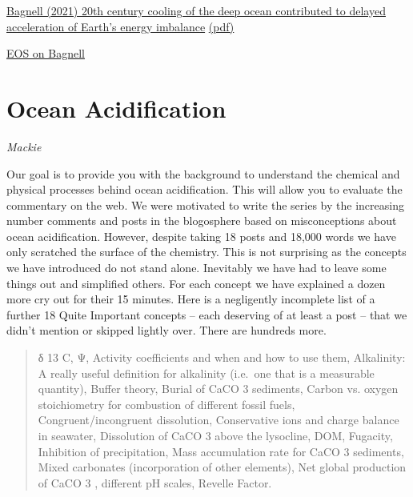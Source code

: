 \documentclass[
]{book}
\begin{document}
\href{https://www.nature.com/articles/s41467-021-24472-3}{Bagnell (2021) 20th century cooling of the deep ocean contributed to delayed acceleration of Earth's energy imbalance}
\href{pdf/Bagnell_2021_Deep_Ocean_Cooling.pdf}{(pdf)}

\href{https://eos.org/articles/deep-ocean-cooling-may-have-offset-global-warming-until-1990}{EOS on Bagnell}

\hypertarget{ocean-acidification}{%
\section{Ocean Acidification}\label{ocean-acidification}}

\emph{Mackie}

Our goal is to provide you with the background to understand the chemical and physical
processes behind ocean acidification. This will allow you to evaluate the commentary on the
web. We were motivated to write the series by the increasing number comments and posts
in the blogosphere based on misconceptions about ocean acidification.
However, despite taking 18 posts and 18,000 words we have only scratched the surface of
the chemistry. This is not surprising as the concepts we have introduced do not stand alone.
Inevitably we have had to leave some things out and simplified others. For each concept we
have explained a dozen more cry out for their 15 minutes. Here is a negligently incomplete
list of a further 18 Quite Important concepts -- each deserving of at least a post -- that we
didn't mention or skipped lightly over. There are hundreds more.

\begin{quote}
δ 13 C, Ψ, Activity coefficients and when and how to use them, Alkalinity: A really useful definition for
alkalinity (i.e.~one that is a measurable quantity), Buffer theory, Burial of CaCO 3 sediments, Carbon vs.
oxygen stoichiometry for combustion of different fossil fuels, Congruent/incongruent dissolution,
Conservative ions and charge balance in seawater, Dissolution of CaCO 3 above the lysocline, DOM,
Fugacity, Inhibition of precipitation, Mass accumulation rate for CaCO 3 sediments, Mixed carbonates
(incorporation of other elements), Net global production of CaCO 3 , different pH scales, Revelle Factor.
\end{quote}
\end{document}
